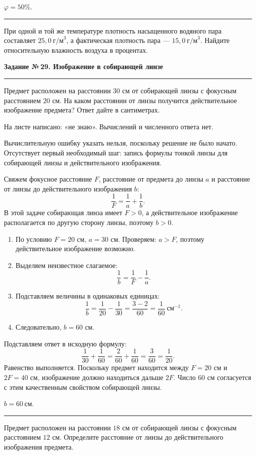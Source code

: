 \documentclass[a4paper,11pt]{article}
\newcommand{\themelabel}[1]{\par\vspace{0.20em}\noindent{\bfseries\textcolor{darkaccent}{#1}}\par\vspace{-0.42em}}
\newcommand{\errorlabel}[1]{\par\vspace{0.20em}\noindent{\bfseries\textcolor{error}{#1}}\par\vspace{-0.42em}}
\newcommand{\tasktitle}[2]{\phantomsection\label{task:#1}{\Large\bfseries\textcolor{darkaccent}{Задание №\,#1. #2}}\par\medskip\noindent\textcolor{accent}{\rule{\linewidth}{0.7pt}}\par\medskip}
\newcommand{\checkline}{\par\vspace{0.45em}\noindent\textcolor{accent}{\rule{\linewidth}{0.4pt}}\par}
\begin{document}
\themelabel{Итог}
\(\boxed{\varphi=50\%.}\)
\checkline
\themelabel{Задача на закрепление}
При одной и той же температуре плотность насыщенного водяного пара составляет $25{,}0\ \text{г/м}^3$, а фактическая плотность пара --- $15{,}0\ \text{г/м}^3$. Найдите относительную влажность воздуха в процентах.
\clearpage

\tasktitle{29}{Изображение в собирающей линзе}
\themelabel{Текст задания}
Предмет расположен на расстоянии $30$ см от собирающей линзы с фокусным расстоянием $20$ см. На каком расстоянии от линзы получится действительное изображение предмета? Ответ дайте в сантиметрах.

\themelabel{Ваше решение и ответ}
На листе написано: «не знаю». Вычислений и численного ответа нет.

\errorlabel{Что осталось невыполненным}
Вычислительную ошибку указать нельзя, поскольку решение не было начато. Отсутствует первый необходимый шаг: запись формулы тонкой линзы для собирающей линзы и действительного изображения.

\themelabel{Ключевая идея}
Свяжем фокусное расстояние $F$, расстояние от предмета до линзы $a$ и расстояние от линзы до действительного изображения $b$:
\[
\boxed{\frac1F=\frac1a+\frac1b.}
\]
В этой задаче собирающая линза имеет $F>0$, а действительное изображение располагается по другую сторону линзы, поэтому $b>0$.

\themelabel{Полное правильное решение}
\begin{enumerate}[leftmargin=*,itemsep=0.16em]
\item По условию $F=20$ см, $a=30$ см. Проверяем: $a>F$, поэтому действительное изображение возможно.
\item Выделяем неизвестное слагаемое:
\[
\frac1b=\frac1F-\frac1a.
\]
\item Подставляем величины в одинаковых единицах:
\[
\frac1b=\frac1{20}-\frac1{30}
=\frac{3-2}{60}=\frac1{60}\ \text{см}^{-1}.
\]
\item Следовательно, $b=60$ см.
\end{enumerate}

\themelabel{Проверка}
Подставляем ответ в исходную формулу:
\[
\frac1{30}+\frac1{60}=\frac2{60}+\frac1{60}=\frac3{60}=\frac1{20}.
\]
Равенство выполняется. Поскольку предмет находится между $F=20$ см и $2F=40$ см, изображение должно находиться дальше $2F$. Число $60$ см согласуется с этим качественным свойством собирающей линзы.

\themelabel{Итог}
\(\boxed{b=60\ \text{см}.}\)
\checkline
\themelabel{Задача на закрепление}
Предмет расположен на расстоянии $18$ см от собирающей линзы с фокусным расстоянием $12$ см. Определите расстояние от линзы до действительного изображения предмета.
\clearpage
\end{document}
